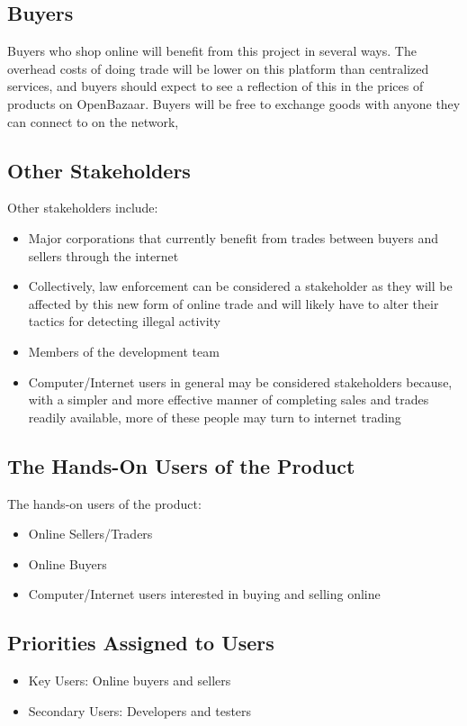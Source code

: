 \documentclass{article}
\begin{document}
\subsection{Buyers}
Buyers who shop online will benefit from this project in several ways. The overhead costs of doing trade will be lower on this platform than centralized services, and buyers should expect to see a reflection of this in the prices of products on OpenBazaar. Buyers will be free to exchange goods with anyone they can connect to on the network, 

\subsection{Other Stakeholders}
Other stakeholders include:

\begin{itemize}
\item
Major corporations that currently benefit from trades between buyers and sellers through the internet

\item
Collectively, law enforcement can be considered a stakeholder as they will be affected by this new form of online trade and will likely have to alter their tactics for detecting illegal activity

\item
Members of the development team

\item
Computer/Internet users in general may be considered stakeholders because, with a simpler and more effective manner of completing sales and trades readily available, more of these people may turn to internet trading
\end{itemize}


\subsection{The Hands-On Users of the Product}
The hands-on users of the product:
\begin{itemize}
\item
Online Sellers/Traders

\item
Online Buyers

\item
Computer/Internet users interested in buying and selling online
\end{itemize}

\subsection{Priorities Assigned to Users}
\begin{itemize}
\item
Key Users: Online buyers and sellers

\item
Secondary Users: Developers and testers
\end{itemize}
\end{document}
